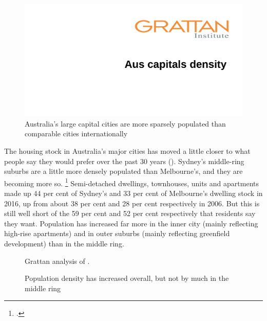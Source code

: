 \begin{figure}
    \begin{minipage}[t][\textheight]{\textwidth}\vspace{1pt}
\caption{Australia's large capital cities are more sparsely populated than comparable cities internationally}\label{fig:aus-density-global-comparison}
\includegraphics[page=2]{atlas/Aus-capitals-density.pdf}
    \end{minipage}
\end{figure}

The housing stock in Australia's major cities has moved a little closer to what people say they would prefer over the past 30 years ().
Sydney's middle-ring suburbs are a little more densely populated than Melbourne's, and they are becoming more so.%
    \footcites{coffee-visualising-pop-change}[][29--30]{FloodBaker2010}[][5--7]{SGS2013Infrastructure}
Semi-detached dwellings, townhouses, units and apartments made up 44 per cent of Sydney's and 33 per cent of Melbourne's dwelling stock in 2016, up from about 38 per cent and 28 per cent respectively in 2006.
But this is still well short of the 59 per cent and 52 per cent respectively that residents say they want.
Population has increased far more in the inner city (mainly reflecting high-rise apartments) and in outer suburbs (mainly reflecting greenfield development) than in the middle ring.

\begin{figure}
\caption{Population density has increased overall, but not by much in the middle ring}\label{fig:pop-density-cities}
%
{Grattan analysis of \textcites{coffee-visualising-pop-change}{ABS20016Censuspopulationhousing}.}
\end{figure}


